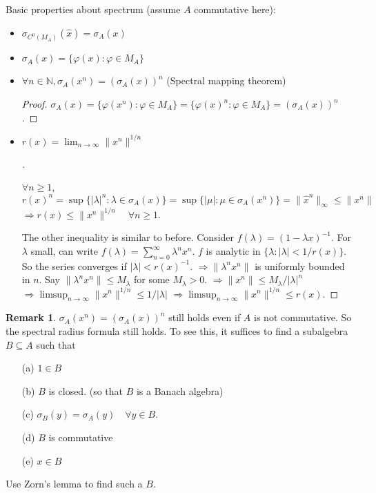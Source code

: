 \documentclass{article}
\theoremstyle{definition}
\newtheorem{rem}{Remark}
\newenvironment{proofs}[1][\proofname]{%
  \begin{proof}[#1]$ $\par\nobreak\ignorespaces
}{%
  \end{proof}
}
\newcommand{\NN}{\mathbb N}
\newcommand{\Ra}{\Rightarrow}
\begin{document}
Basic properties about spectrum (assume $A$ commutative here):
\begin{itemize}
	\item $\sigma_{C^0(M_A)} (\widehat{x}) = \sigma_A(x)$

	\item $\sigma_A(x) = \{\varphi(x): \varphi \in M_A\}$

	\item $\forall n \in \NN, \sigma_A (x^n) = (\sigma_A(x))^n$ (Spectral mapping theorem)
		\begin{proof}
			$\sigma_A(x) = \{\varphi(x^n): \varphi \in M_A\} = \{\varphi(x)^n: \varphi \in M_A\} = (\sigma_A(x))^n$.
		\end{proof}

	\item $r(x) = \lim_{n \to \infty} \|x^n\|^{1/n}$

		\begin{proofs}
			$\forall n \geq 1$,
			\[
				r(x)^n = \sup \{|\lambda|^n: \lambda \in \sigma_A(x)\} = \sup\{|\mu|: \mu \in \sigma_A(x^n)\} = \|\widehat{x}^n\|_\infty \leq \|x^n\|
			\]
			$\Ra r(x) \leq \|x^n\|^{1/n} \quad \forall n \geq 1$.
			\par The other inequality is similar to before.
			Consider $f(\lambda) = (1 - \lambda x)^{-1}$.
			For $\lambda$ small, can write $f(\lambda) = \sum_{n = 0}^\infty \lambda^n x^n$.
			$f$ is analytic in $\{\lambda: |\lambda| < 1/r(x)\}$.
			So the series converges if $|\lambda| < r(x)^{-1}$.
			$\Ra \|\lambda^n x^n\|$ is uniformly bounded in $n$.
			Say $\|\lambda^n x^n\| \leq M_\lambda$ for some $M_\lambda > 0$.
			$\Ra \|x^n\| \leq M_\lambda/|\lambda|^n$
			$\Ra \limsup_{n \to \infty} \|x^n\|^{1/n} \leq 1/|\lambda|$
			$\Ra \limsup_{n \to \infty} \|x^n\|^{1/n} \leq r(x)$.
		\end{proofs}
\end{itemize}

\begin{rem}
	$\sigma_A(x^n) = (\sigma_A(x))^n$ still holds even if $A$ is not commutative.
	So the spectral radius formula still holds.
	To see this, it suffices to find a subalgebra $B \subseteq A$ such that
	\begin{enumerate}
		\item[(a)] $1 \in B$

		\item[(b)] $B$ is closed. (so that $B$ is a Banach algebra)

		\item[(c)] $\sigma_B(y) = \sigma_A(y) \quad \forall y \in B$.

		\item[(d)] $B$ is commutative

		\item[(e)] $x \in B$
	\end{enumerate}
	Use Zorn's lemma to find such a $B$.
\end{rem}
\end{document}
